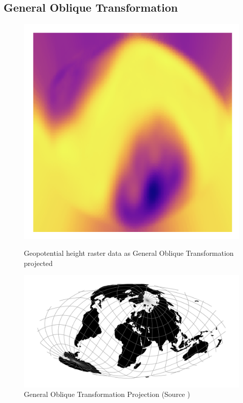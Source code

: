 \subsection{General Oblique Transformation}
\begin{figure}[H]
    \centering
    \begin{minipage}{0.30\textwidth}
        \centering
        \includegraphics[width=0.9\linewidth]{figures/chapter-8/geopoth_got.png}
        \caption{ Geopotential height raster data as General Oblique Transformation projected}
        \label{fig:ob_tran_geopoth_raster}
    \end{minipage}\hfill
    \begin{minipage}{0.30\textwidth}
        \centering
        \includegraphics[width=0.9\linewidth]{figures/chapter-8/ob_tran.png}
        \caption{General Oblique Transformation Projection (Source \cite{PROJ_SITE})}

\end{minipage}
\end{figure}
